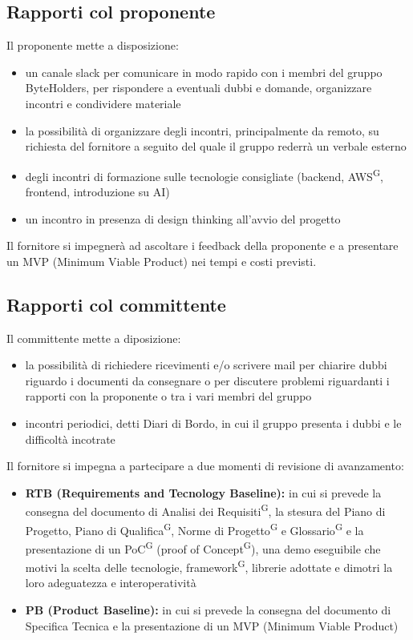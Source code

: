 \documentclass[a4paper, 11pt]{article}
\begin{document}
\subsection{Rapporti col proponente}
Il proponente mette a disposizione:
\begin{itemize}
    \item un canale slack per comunicare in modo rapido con i membri del gruppo ByteHolders, per rispondere a eventuali dubbi e domande, organizzare incontri e condividere materiale
    \item la possibilità di organizzare degli incontri, principalmente da remoto, su richiesta del fornitore a seguito del quale il gruppo rederrà un verbale esterno 
    \item degli incontri di formazione sulle tecnologie consigliate (backend, AWS\textsuperscript{G}, frontend, introduzione su AI) 
    \item un incontro in presenza di design thinking all'avvio del progetto
\end{itemize}
Il fornitore si impegnerà ad ascoltare i feedback della proponente e a presentare un MVP (Minimum Viable Product) nei tempi e costi previsti.

\subsection{Rapporti col committente}
Il committente mette a diposizione:
\begin{itemize}
    \item la possibilità di richiedere ricevimenti e/o scrivere mail per chiarire dubbi riguardo i documenti da consegnare o per discutere problemi riguardanti i rapporti con la proponente o tra i vari membri del gruppo
    \item incontri periodici, detti Diari di Bordo, in cui il gruppo presenta i dubbi e le difficoltà incotrate
\end{itemize}
Il fornitore si impegna a partecipare a due momenti di revisione di avanzamento:
\begin{itemize}
    \item \textbf{RTB (Requirements and Tecnology Baseline):} in cui si prevede la consegna del documento di Analisi dei Requisiti\textsuperscript{G}, la stesura del Piano di Progetto, Piano di Qualifica\textsuperscript{G}, Norme di Progetto\textsuperscript{G} e Glossario\textsuperscript{G} e la presentazione di un PoC\textsuperscript{G} (proof of Concept\textsuperscript{G}), una demo eseguibile che motivi la scelta delle tecnologie, framework\textsuperscript{G}, librerie adottate e dimotri la loro adeguatezza e interoperatività  
    \item \textbf{PB (Product Baseline):} in cui si prevede la consegna del documento di Specifica Tecnica e la presentazione di un MVP (Minimum Viable Product)
\end{itemize}
\end{document}
